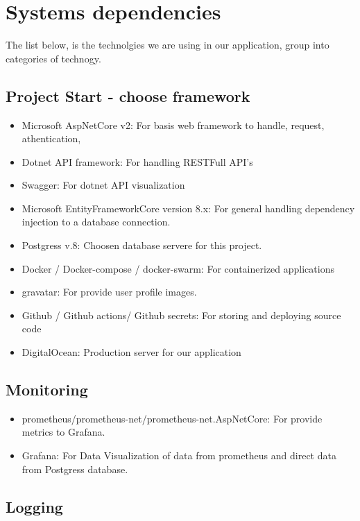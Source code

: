 \section{Systems dependencies}

The list below, is the technolgies we are using in our application, group into categories of technogy. 

\subsection*{Project Start - choose framework}

\begin{itemize}
    \item Microsoft AspNetCore v2: For basis web framework to handle, request, athentication, 
    \item Dotnet API framework: For handling RESTFull API's 
    \item Swagger: For dotnet API visualization
    \item Microsoft EntityFrameworkCore version 8.x: For general handling dependency injection to a database connection. 
    \item Postgress v.8: Choosen database servere for this project. 
    \item Docker / Docker-compose / docker-swarm: For containerized applications 
    \item gravatar: For provide user profile images. 
    \item Github / Github actions/ Github secrets: For storing and deploying source code
    \item DigitalOcean: Production server for our application 
\end{itemize}


\subsection*{Monitoring}

\begin{itemize}
    \item prometheus/prometheus-net/prometheus-net.AspNetCore: For provide metrics to Grafana. 
    \item Grafana: For Data Visualization of data from prometheus and direct data from Postgress database. 
\end{itemize}

\subsection*{Logging}


